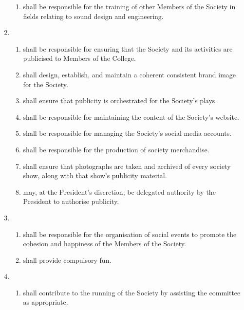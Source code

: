 \documentclass[a4paper]{tufte-handout}
\newcommand{\policyOffset}{12pt}
\newcommand{\policyPub}[2][\policyOffset]{\marginnote[#1]{\textsc{Publicity Policy \S#2}}}
\begin{document}
\begin{enumerate}[resume]
\begin{enumerate}
            \item shall be responsible for the training of other Members of the Society in fields relating to sound design and engineering.
        \end{enumerate}
    \item {}
        \begin{enumerate}
            \item shall be responsible for ensuring that the Society and its activities are publicised to Members of the College.
            \item shall design, establish, and maintain a coherent consistent brand image for the Society.
            \item shall ensure that publicity is orchestrated for the Society's plays.
            \item shall be responsible for maintaining the content of the Society's website.
            \item shall be responsible for managing the Society's social media accounts.
            \item shall be responsible for the production of society merchandise.
            \item shall ensure that photographs are taken and archived of every society show, along with that show's publicity material.
            \item \policyPub{4} may, at the President's discretion, be delegated authority by the President to authorise publicity.
        \end{enumerate}
    \item {}
        \begin{enumerate}
            \item shall be responsible for the organisation of social events to promote the cohesion and happiness of the Members of the Society.
            \item shall provide compulsory fun.
        \end{enumerate}
    \item {}
        \begin{enumerate}
            \item shall contribute to the running of the Society by assisting the committee as appropriate.
        \end{enumerate}
\end{enumerate}
\end{document}
